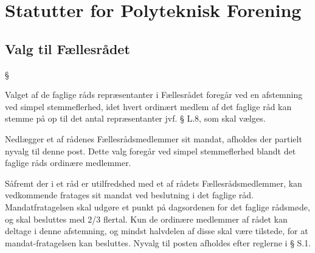 \setcounter{section}{19}
\setcounter{subsection}{0}
\section*{Statutter for Polyteknisk Forening}
\label{kap:valgtilfaellesraad}
\subsection{Valg til Fællesrådet}

\begin{list}
{\S {}}{}

\item Valget af de faglige råds repræsentanter i Fællesrådet foregår ved en afstemning ved simpel stemmeflerhed,
           idet hvert ordinært medlem af det faglige råd kan stemme på op til det antal repræsentanter jvf. § L.8, som
               skal vælges.
\item Nedlægger et af rådenes Fællesrådsmedlemmer sit mandat, afholdes der partielt nyvalg til denne post. Dette
          valg foregår ved simpel stemmeflerhed blandt det faglige råds ordinære medlemmer.
\item Såfremt der i et råd er utilfredshed med et af rådets Fællesrådsmedlemmer, kan vedkommende fratages sit
           mandat ved beslutning i det faglige råd.
           Mandatfratagelsen skal udgøre et punkt på dagsordenen for det faglige rådsmøde, og skal besluttes med 2/3
              flertal. Kun de ordinære medlemmer af rådet kan deltage i denne afstemning, og mindst halvdelen af disse
               skal være tilstede, for at mandat-fratagelsen kan besluttes.
               Nyvalg til posten afholdes efter reglerne i § S.1.

\end{list}
